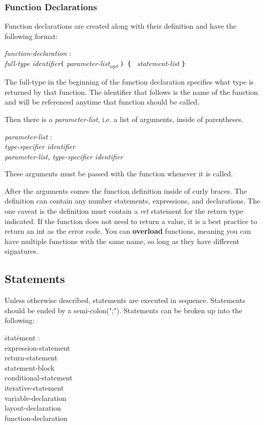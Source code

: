 \documentclass{article}
\begin{document}
\subsubsection{Function Declarations}
\label{sec:funcdec}
Function declarations are created along with their definition and have the following format:
\begin{tabbing}
	\= \emph{function}\=\emph{-declaration} : \\
		\> \> \emph{full-type identifier}\texttt{(} \emph{parameter-list\textsubscript{opt}} \texttt{) 
\{ } \emph{statement-list} \texttt{\}}
\end{tabbing}

The full-type in the beginning of the function declaration specifies what type is returned by that function. The identifier that follows is the name of the function and will be referenced anytime that function should be called. 

Then there is a \emph{parameter-list}, i.e. a list of arguments, inside of parentheses.
\begin{tabbing}
	\= \emph{param}\=\emph{eter-list} : \\
		\> \> \emph{type-specifier identifier} \\
		\> \> \emph{parameter-list, type-specifier identifier}
\end{tabbing}
These arguments must be passed with the function whenever it is called.

After the arguments comes the function definition inside of curly braces. The definition can contain any number statements, expressions, and declarations. The one caveat is the definition must contain a \emph{ret} statement for the return type indicated. If the function does not need to return a value, it is a best practice to return an int as the error code. You can \textbf{overload} functions, meaning you can have multiple functions with the same name, so long as they have different signatures.

\subsection{Statements}
Unless otherwise described, statements are executed in sequence. Statements should be ended by a semi-colon(";"). Statements can be broken up into the following:
\begin{itshape}
\begin{tabbing}
	\= stat\=ement : \\
		\> \> expression-statement \\
		\> \> return-statement \\
		\> \> statement-block \\
		\>\> conditional-statement \\
		\> \> iterative-statement \\
		\> \> variable-declaration \\
		\> \> layout-declaration \\
		\> \> function-declaration
\end{tabbing}
\end{itshape}
\end{document}
